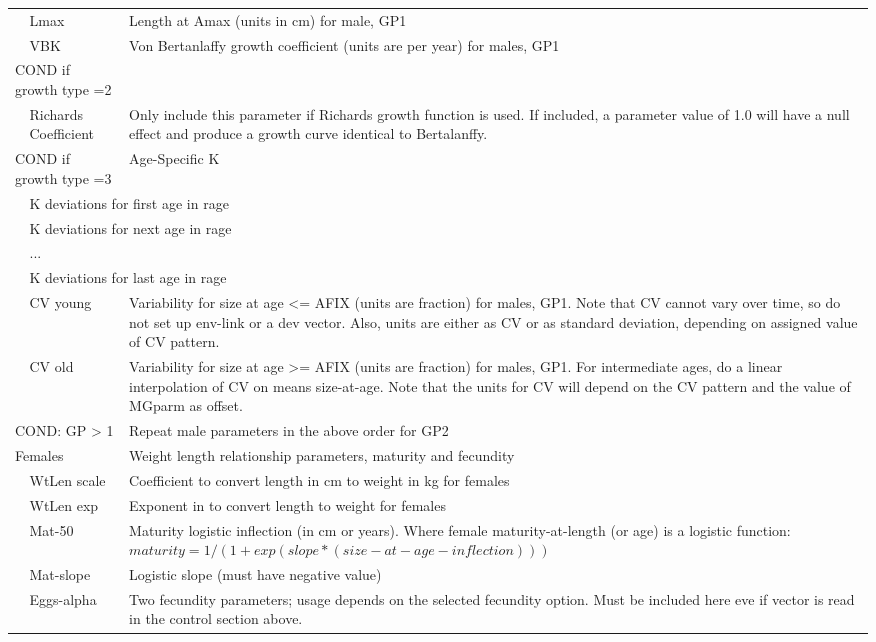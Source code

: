 \begin{center}
\begin{longtable}{p{1cm} p{2.5cm} p{10cm}}
		& Lmax & Length at Amax (units in cm) for male, GP1\ \\
		& VBK &  Von Bertanlaffy growth coefficient (units are per year) for males, GP1\\
		\hline
		\multicolumn{2}{l}{COND if growth type =2 } & \\
		& Richards Coefficient & Only include this parameter if Richards growth function is used.  If included, a parameter value of 1.0 will have a null effect and produce a growth curve identical to Bertalanffy.\\
		\multicolumn{2}{l}{COND if growth type =3 } & Age-Specific K \\
		& \multicolumn{2}{l}{K deviations for first age in rage}\\
		& \multicolumn{2}{l}{K deviations for next age in rage}\\
		& ... & \\
		& \multicolumn{2}{l}{K deviations for last age in rage}\\
		\hline
		& CV young & Variability for size at age <= AFIX (units are fraction) for males, GP1.  Note that CV cannot vary over time, so do not set up env-link or a dev vector.  Also, units are either as CV or as standard deviation, depending on assigned value of CV pattern.\\
		& CV old &  Variability for size at age >= AFIX (units are fraction) for males, GP1. For intermediate ages, do a linear interpolation of CV on means size-at-age.  Note that the units for CV will depend on the CV pattern and the value of MGparm as offset.\\
		\multicolumn{2}{l}{COND: GP > 1} & Repeat male parameters in the above order for GP2\\
		\hline
		\multicolumn{2}{l}{Females} & Weight length relationship parameters, maturity and fecundity\\
		& WtLen scale & Coefficient to convert length in cm to weight in kg for females\\
		& WtLen exp & Exponent in to convert length to weight for females\\
		& Mat-50 & Maturity logistic inflection (in cm or years).  Where female maturity-at-length (or age) is a logistic function: $maturity = 1/(1+exp(slope*(size-at-age - inflection)))$\\
		& Mat-slope & Logistic slope (must have negative value) \\
		& Eggs-alpha & Two fecundity parameters; usage depends on the selected fecundity option.  Must be included here eve if vector is read in the control section above.\\

\end{longtable}
\end{center}
